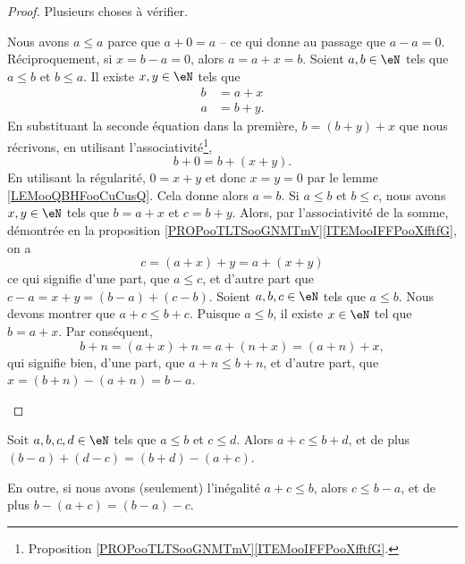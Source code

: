\begin{proof}
	Plusieurs choses à vérifier.
	\begin{subproof}
		Nous avons \( a\leq a\) parce que \( a+0=a\) -- ce qui donne au passage que \( a - a = 0 \). Réciproquement, si \( x = b - a = 0 \), alors \( a = a + x = b \).
		Soient \( a,b\in \eN\) tels que \( a\leq b\) et \( b\leq a\). Il existe \( x,y\in \eN\) tels que
		\begin{subequations}
			\begin{align}
				b & =a+x  \\
				a & =b+y.
			\end{align}
		\end{subequations}
		En substituant la seconde équation dans la première, \( b=(b+y)+x\) que nous récrivons, en utilisant l'associativité\footnote{Proposition \ref{PROPooTLTSooGNMTmV}\ref{ITEMooIFFPooXfftfG}.},
		\begin{equation}
			b+0=b+(x+y).
		\end{equation}
		En utilisant la régularité, \( 0=x+y\) et donc \( x=y=0\) par le lemme \ref{LEMooQBHFooCuCusQ}. Cela donne alors \( a=b\).
		Si \( a\leq b\) et \( b\leq c\), nous avons \( x,y\in \eN\) tels que \( b=a+x\) et \( c=b+y\). Alors, par l'associativité de la somme, démontrée en la proposition \ref{PROPooTLTSooGNMTmV}\ref{ITEMooIFFPooXfftfG}, on a
		\begin{equation}
			c=(a+x)+y=a+(x+y)
		\end{equation}
		ce qui signifie d'une part, que \( a\leq c\), et d'autre part que \( c - a = x + y = (b - a) + (c - b) \).
		Soient \( a,b,c\in \eN\) tels que \( a\leq b\). Nous devons montrer que \( a+c\leq b+c\). Puisque \( a\leq b\), il existe \( x\in \eN\) tel que \( b=a+x\). Par conséquent,
		\begin{equation}
			b+n=(a+x)+n=a+(n+x) = (a+n)+x,
		\end{equation}
		qui signifie bien, d'une part, que \( a+n\leq b+n\), et d'autre part, que \( x = (b + n) - (a + n) = b - a\).
	\end{subproof}
\end{proof}

\begin{proposition}	\label{PROPooSoustractionN}
	Soit \( a,b, c, d \in \eN\) tels que \( a\leq b\) et \( c \leq d \). Alors \( a + c \leq b + d \), et de plus \( (b - a) + (d - c) = (b + d) - (a + c)\).
 
 	En outre, si nous avons (seulement) l'inégalité \( a + c \leq b \), alors \( c \leq b-a \), et de plus \( b - (a+c) = (b-a) - c \). 
\end{proposition}

